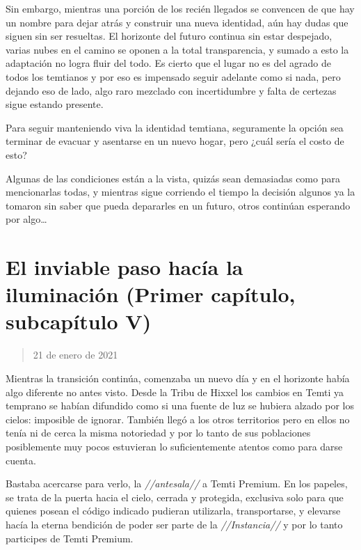 \documentclass[
  spanish,
]{book}
\begin{document}
Sin embargo, mientras una porción de los recién llegados se convencen de que hay un nombre para dejar atrás y construir una nueva identidad, aún hay dudas que siguen sin ser resueltas. El horizonte del futuro continua sin estar despejado, varias nubes en el camino se oponen a la total transparencia, y sumado a esto la adaptación no logra fluir del todo. Es cierto que el lugar no es del agrado de todos los temtianos y por eso es impensado seguir adelante como si nada, pero dejando eso de lado, algo raro mezclado con incertidumbre y falta de certezas sigue estando presente.

Para seguir manteniendo viva la identidad temtiana, seguramente la opción sea terminar de evacuar y asentarse en un nuevo hogar, pero ¿cuál sería el costo de esto?

Algunas de las condiciones están a la vista, quizás sean demasiadas como para mencionarlas todas, y mientras sigue corriendo el tiempo la decisión algunos ya la tomaron sin saber que pueda depararles en un futuro, otros continúan esperando por algo\ldots{}

\hypertarget{el-inviable-paso-hacuxeda-la-iluminaciuxf3n-primer-capuxedtulo-subcapuxedtulo-v}{%
\section{El inviable paso hacía la iluminación (Primer capítulo, subcapítulo V)}\label{el-inviable-paso-hacuxeda-la-iluminaciuxf3n-primer-capuxedtulo-subcapuxedtulo-v}}

\begin{quote}
21 de enero de 2021
\end{quote}

Mientras la transición continúa, comenzaba un nuevo día y en el horizonte había algo diferente no antes visto. Desde la Tribu de Hixxel los cambios en Temti ya temprano se habían difundido como si una fuente de luz se hubiera alzado por los cielos: imposible de ignorar. También llegó a los otros territorios pero en ellos no tenía ni de cerca la misma notoriedad y por lo tanto de sus poblaciones posiblemente muy pocos estuvieran lo suficientemente atentos como para darse cuenta.

Bastaba acercarse para verlo, la \emph{//antesala//} a Temti Premium. En los papeles, se trata de la puerta hacia el cielo, cerrada y protegida, exclusiva solo para que quienes posean el código indicado pudieran utilizarla, transportarse, y elevarse hacía la eterna bendición de poder ser parte de la \emph{//Instancia//} y por lo tanto participes de Temti Premium.
\end{document}
